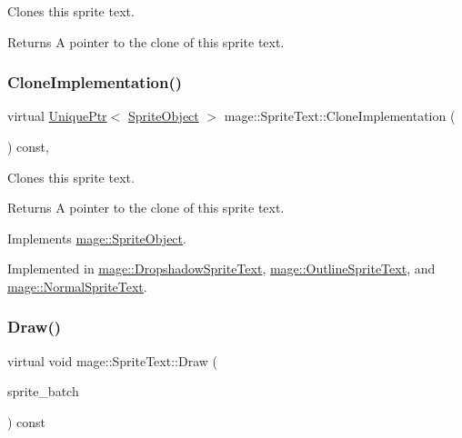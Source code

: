Clones this sprite text.

\begin{DoxyReturn}{Returns}
A pointer to the clone of this sprite text. 
\end{DoxyReturn}
\hypertarget{classmage_1_1_sprite_text_a2b9f59a1730f8b9691f173251a2b4944}{}\label{classmage_1_1_sprite_text_a2b9f59a1730f8b9691f173251a2b4944} 
\subsubsection{\texorpdfstring{Clone\+Implementation()}{CloneImplementation()}}
{\footnotesize\ttfamily virtual \hyperlink{namespacemage_a8c307fbcc33bce9b7f2aa4c26c3b95cf}{Unique\+Ptr}$<$ \hyperlink{classmage_1_1_sprite_object}{Sprite\+Object} $>$ mage\+::\+Sprite\+Text\+::\+Clone\+Implementation (\begin{DoxyParamCaption}{ }\end{DoxyParamCaption}) const\hspace{0.3cm}{\ttfamily [private]}, {}}

Clones this sprite text.

\begin{DoxyReturn}{Returns}
A pointer to the clone of this sprite text. 
\end{DoxyReturn}


Implements \hyperlink{classmage_1_1_sprite_object_acbbe3d5894e5a43df411b7e5785ae174}{mage\+::\+Sprite\+Object}.



Implemented in \hyperlink{classmage_1_1_dropshadow_sprite_text_ae4b94b4120a9cae6bae11b61e7aed39b}{mage\+::\+Dropshadow\+Sprite\+Text}, \hyperlink{classmage_1_1_outline_sprite_text_af8d29408abb61c05a23499bf37c4c7b0}{mage\+::\+Outline\+Sprite\+Text}, and \hyperlink{classmage_1_1_normal_sprite_text_a261996eafdc02f39c6c57eb2b7ec2cea}{mage\+::\+Normal\+Sprite\+Text}.

\hypertarget{classmage_1_1_sprite_text_a45d5ac8410d5a46b26e8491946a2ad9e}{}\label{classmage_1_1_sprite_text_a45d5ac8410d5a46b26e8491946a2ad9e} 
\subsubsection{\texorpdfstring{Draw()}{Draw()}}
{\footnotesize\ttfamily virtual void mage\+::\+Sprite\+Text\+::\+Draw (\begin{DoxyParamCaption}\item[{Sprite\+Batch \&}]{sprite\+\_\+batch }\end{DoxyParamCaption}) const\hspace{0.3cm}{\ttfamily [pure virtual]}}

